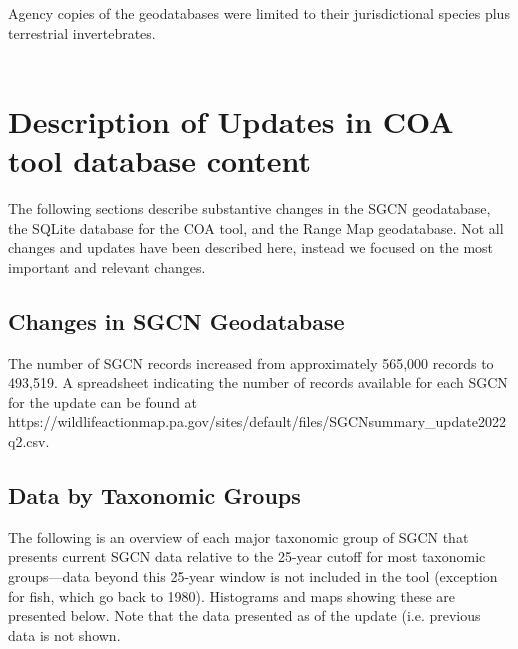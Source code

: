 \documentclass{article}\usepackage[]{graphicx}\usepackage[table]{xcolor}
\begin{document}
\noindent Agency copies of the geodatabases were limited to their jurisdictional species plus terrestrial invertebrates. \\\\
\noindent  

\newpage
\section*{Description of Updates in COA tool database content}
\noindent The following sections describe substantive changes in the SGCN geodatabase, the SQLite database for the COA tool, and the Range Map geodatabase. Not all changes and updates have been described here, instead we focused on the most important and relevant changes.

\subsection*{Changes in SGCN Geodatabase}
\noindent The number of SGCN records increased from approximately 565,000 records to 493,519. A spreadsheet indicating the number of records available for each SGCN for the  update can be found at \\
https://wildlifeactionmap.pa.gov/sites/default/files/SGCNsummary_update2022q2.csv.

\subsection*{Data by Taxonomic Groups}
\noindent The following is an overview of each major taxonomic group of SGCN that presents current SGCN data relative to the 25-year cutoff for most taxonomic groups---data beyond this 25-year window is not included in the tool (exception for fish, which go back to 1980).  Histograms and maps showing these are presented below. Note that the data presented as of the  update (i.e. previous data is not shown. %
\medskip
\end{document}
